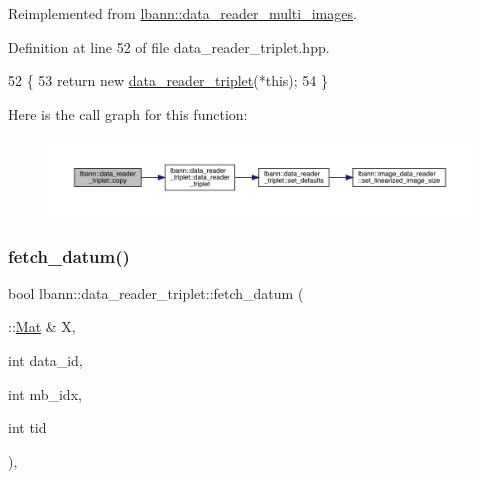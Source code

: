 Reimplemented from \hyperlink{classlbann_1_1data__reader__multi__images_a46e1b7fab6ac5af4398cb9b5da900a74}{lbann\+::data\+\_\+reader\+\_\+multi\+\_\+images}.



Definition at line 52 of file data\+\_\+reader\+\_\+triplet.\+hpp.


\begin{DoxyCode}
52                                              \{
53     \textcolor{keywordflow}{return} \textcolor{keyword}{new} \hyperlink{classlbann_1_1data__reader__triplet_ab0d6db1085010ea95fa1c01eccce0e6c}{data\_reader\_triplet}(*\textcolor{keyword}{this});
54   \}
\end{DoxyCode}
Here is the call graph for this function\+:\nopagebreak
\begin{figure}[H]
\begin{center}
\leavevmode
\includegraphics[width=350pt]{classlbann_1_1data__reader__triplet_aa390c4e801dfa367895ef0904daa0b77_cgraph}
\end{center}
\end{figure}
\mbox{\label{classlbann_1_1data__reader__triplet_af3f41e46bef2fbd3e19d545fa27f11ce}} 
\subsubsection{\texorpdfstring{fetch\+\_\+datum()}{fetch\_datum()}}
{\footnotesize\ttfamily bool lbann\+::data\+\_\+reader\+\_\+triplet\+::fetch\+\_\+datum (\begin{DoxyParamCaption}\item[{\+::\hyperlink{base_8hpp_a68f11fdc31b62516cb310831bbe54d73}{Mat} \&}]{X,  }\item[{int}]{data\+\_\+id,  }\item[{int}]{mb\+\_\+idx,  }\item[{int}]{tid }\end{DoxyParamCaption})\hspace{0.3cm}{\ttfamily [override]}, {\ttfamily [protected]}}



